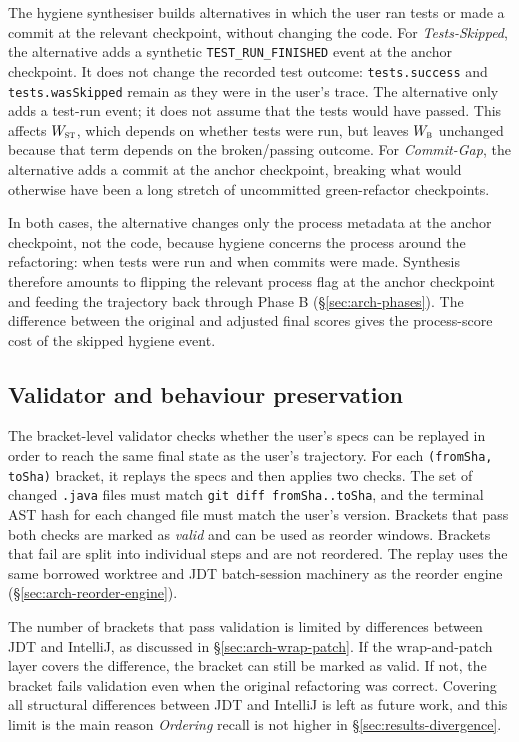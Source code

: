 The hygiene synthesiser builds alternatives in which the user ran tests or made a commit at the relevant checkpoint, without changing the code. For \emph{Tests-Skipped}, the alternative adds a synthetic \texttt{TEST\_RUN\_FINISHED} event at the anchor checkpoint. It does not change the recorded test outcome: \texttt{tests.success} and \texttt{tests.wasSkipped} remain as they were in the user's trace. The alternative only adds a test-run event; it does not assume that the tests would have passed. This affects $W_{\textsc{st}}$, which depends on whether tests were run, but leaves $W_{\textsc{b}}$ unchanged because that term depends on the broken/passing outcome. For \emph{Commit-Gap}, the alternative adds a commit at the anchor checkpoint, breaking what would otherwise have been a long stretch of uncommitted green-refactor checkpoints.

In both cases, the alternative changes only the process metadata at the anchor checkpoint, not the code, because hygiene concerns the process around the refactoring: when tests were run and when commits were made. Synthesis therefore amounts to flipping the relevant process flag at the anchor checkpoint and feeding the trajectory back through Phase B (\S\ref{sec:arch-phases}). The difference between the original and adjusted final scores gives the process-score cost of the skipped hygiene event.

\subsection{Validator and behaviour preservation}
\label{sec:methodology-validator}

The bracket-level validator checks whether the user's specs can be replayed in order to reach the same final state as the user's trajectory. For each \texttt{(fromSha, toSha)} bracket, it replays the specs and then applies two checks. The set of changed \texttt{.java} files must match \texttt{git diff fromSha..toSha}, and the terminal AST hash for each changed file must match the user's version. Brackets that pass both checks are marked as \emph{valid} and can be used as reorder windows. Brackets that fail are split into individual steps and are not reordered. The replay uses the same borrowed worktree and JDT batch-session machinery as the reorder engine (\S\ref{sec:arch-reorder-engine}).

The number of brackets that pass validation is limited by differences between JDT and IntelliJ, as discussed in \S\ref{sec:arch-wrap-patch}. If the wrap-and-patch layer covers the difference, the bracket can still be marked as valid. If not, the bracket fails validation even when the original refactoring was correct. Covering all structural differences between JDT and IntelliJ is left as future work, and this limit is the main reason \emph{Ordering} recall is not higher in \S\ref{sec:results-divergence}.


